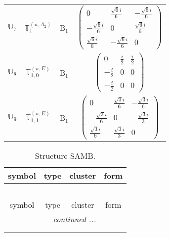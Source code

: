 \documentclass[fleqn,10pt,landscape]{article}
\begin{document}
\begin{itemize}
\begin{center}
\begin{longtable}{c|c|c|c}
$ \mathbb{U}_{7} $ & $\mathbb{T}_{1}^{(u,A_{2})}$ & B$_{1}$ & $\begin{pmatrix} 0 & \frac{\sqrt{6} i}{6} & - \frac{\sqrt{6} i}{6} \\ - \frac{\sqrt{6} i}{6} & 0 & \frac{\sqrt{6} i}{6} \\ \frac{\sqrt{6} i}{6} & - \frac{\sqrt{6} i}{6} & 0 \end{pmatrix}$ \\
$ \mathbb{U}_{8} $ & $\mathbb{T}_{1,0}^{(u,E)}$ & B$_{1}$ & $\begin{pmatrix} 0 & \frac{i}{2} & \frac{i}{2} \\ - \frac{i}{2} & 0 & 0 \\ - \frac{i}{2} & 0 & 0 \end{pmatrix}$ \\
$ \mathbb{U}_{9} $ & $\mathbb{T}_{1,1}^{(u,E)}$ & B$_{1}$ & $\begin{pmatrix} 0 & \frac{\sqrt{3} i}{6} & - \frac{\sqrt{3} i}{6} \\ - \frac{\sqrt{3} i}{6} & 0 & - \frac{\sqrt{3} i}{3} \\ \frac{\sqrt{3} i}{6} & \frac{\sqrt{3} i}{3} & 0 \end{pmatrix}$ \\
\end{longtable}
\end{center}
\begin{center}
\renewcommand{\arraystretch}{1.3}
\begin{longtable}{c|c|c|c}
\caption{Structure SAMB.}
 \\
 \hline \hline
symbol & type & cluster & form \\ \hline \endfirsthead

\multicolumn{3}{l}{\tablename\ \thetable{}} \\
 \hline \hline
symbol & type & cluster & form \\ \hline \endhead

 \hline \hline
\multicolumn{3}{r}{\footnotesize\it continued ...} \\ \endfoot

 \hline \hline
\multicolumn{3}{r}{} \\ \endlastfoot


\end{longtable}
\end{center}
\end{itemize}
\end{document}
